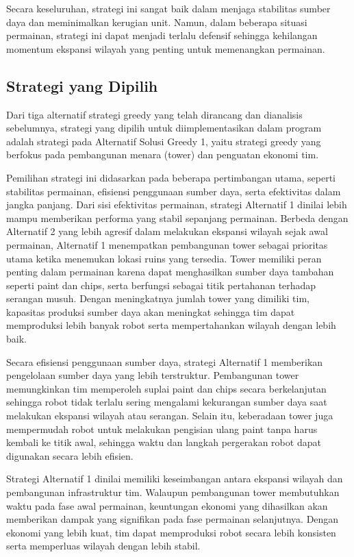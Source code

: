 \documentclass{article}
\begin{document}
Secara keseluruhan, strategi ini sangat baik dalam menjaga stabilitas sumber daya dan meminimalkan 
kerugian unit. Namun, dalam beberapa situasi permainan, strategi ini dapat menjadi terlalu defensif 
sehingga kehilangan momentum ekspansi wilayah yang penting untuk memenangkan permainan.


\subsection{Strategi yang Dipilih}

Dari tiga alternatif strategi greedy yang telah dirancang dan dianalisis sebelumnya, strategi yang dipilih 
untuk diimplementasikan dalam program adalah strategi pada Alternatif Solusi Greedy 1, yaitu strategi 
greedy yang berfokus pada pembangunan menara (tower) dan penguatan ekonomi tim.

Pemilihan strategi ini didasarkan pada beberapa pertimbangan utama, seperti stabilitas permainan, 
efisiensi penggunaan sumber daya, serta efektivitas dalam jangka panjang. Dari sisi efektivitas 
permainan, strategi Alternatif 1 dinilai lebih mampu memberikan performa yang stabil sepanjang 
permainan. Berbeda dengan Alternatif 2 yang lebih agresif dalam melakukan ekspansi wilayah sejak awal 
permainan, Alternatif 1 menempatkan pembangunan tower sebagai prioritas utama ketika menemukan 
lokasi ruins yang tersedia. Tower memiliki peran penting dalam permainan karena dapat menghasilkan 
sumber daya tambahan seperti paint dan chips, serta berfungsi sebagai titik pertahanan terhadap serangan 
musuh. Dengan meningkatnya jumlah tower yang dimiliki tim, kapasitas produksi sumber daya akan 
meningkat sehingga tim dapat memproduksi lebih banyak robot serta mempertahankan wilayah dengan 
lebih baik.

Secara efisiensi penggunaan sumber daya, strategi Alternatif 1 memberikan pengelolaan sumber daya 
yang lebih terstruktur. Pembangunan tower memungkinkan tim memperoleh suplai paint dan chips secara 
berkelanjutan sehingga robot tidak terlalu sering mengalami kekurangan sumber daya saat melakukan 
ekspansi wilayah atau serangan. Selain itu, keberadaan tower juga mempermudah robot untuk melakukan 
pengisian ulang paint tanpa harus kembali ke titik awal, sehingga waktu dan langkah pergerakan robot 
dapat digunakan secara lebih efisien.

Strategi Alternatif 1 dinilai memiliki keseimbangan antara ekspansi wilayah dan pembangunan 
infrastruktur tim. Walaupun pembangunan tower membutuhkan waktu pada fase awal permainan, 
keuntungan ekonomi yang dihasilkan akan memberikan dampak yang signifikan pada fase permainan 
selanjutnya. Dengan ekonomi yang lebih kuat, tim dapat memproduksi robot secara lebih konsisten serta 
memperluas wilayah dengan lebih stabil.
\end{document}
